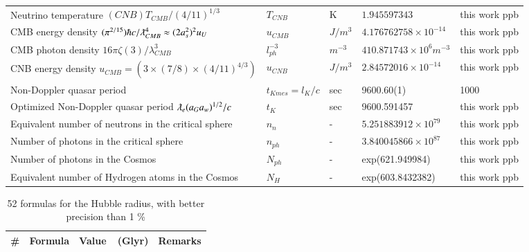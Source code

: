 \documentclass[a4paper,9pt]{article}
\begin{document}
\begin{appendix}
\begin{table}
\begin{tabular}{lllll}
   
   Neutrino temperature  $(CNB)T_{CMB}/ (4/11)^{1/3}$ & $T_{CNB}$ & K & $1.945597343$ & this work ppb \\ 
   CMB energy density $(\pi^{2/15})\hbar c/ \lambdabar_{CMB}^4 \approx (2a_s^2)^2 u_U$ & $u_{CMB}$ & $J/m^3$ & $4.176762758 \times 10^{-14}$ & this work ppb\\ 
   CMB photon density $16 \pi \zeta (3)/\lambda_{CMB}^3$  & $l_{ph}^{-3}$  & $m^{-3}$   & $410.871743 \times 10^6 m^{-3}$ & this work ppb \\ 
   CNB energy density $u_{CMB} = (3\times (7/8) \times (4/11)^{4/3})$ & $u_{CNB}$ & $J/m^3$ & $2.84572016\times 10^{-14}$ & this work ppb \\  
   Non-Doppler quasar period & $t_{Kmes} = l_K/c$ & sec & 9600.60(1) & 1000 \\  
   Optimized Non-Doppler quasar period $\lambdabar_e (a_Ga_w)^{1/2}/c$ & $t_{K}$ & sec & 9600.591457 & this work ppb \\ 
   Equivalent number of neutrons in the critical sphere & $n_n$ & - & $5.251883912 \times 10^{79}$ & this work ppb \\ 
   Number of photons in the critical sphere  & $n_{ph}$ & - & $3.840045866 \times 10^{87}$ & this work ppb \\ 
   Number of photons in the Cosmos  & $N_{ph}$ & - & exp(621.949984) & this work ppb \\ 
   Equivalent number of Hydrogen atoms in the Cosmos  & $N_H$ & - & exp(603.8432382) & this work ppb \\
 \bottomrule
  \end{tabular}
\end{table}
 

\begin{table}
\caption{52 formulas for the Hubble radius, with better precision than 1 \%}
\label{tab:4:table4}
  \hskip-2.0cm\begin{tabular}{llll}
    \toprule
    \cmidrule(r){1-4}
   \#     & Formula     & Value~~(Glyr) & Remarks \\
    \midrule
    

\end{tabular}
\end{table}
\end{appendix}
\end{document}
